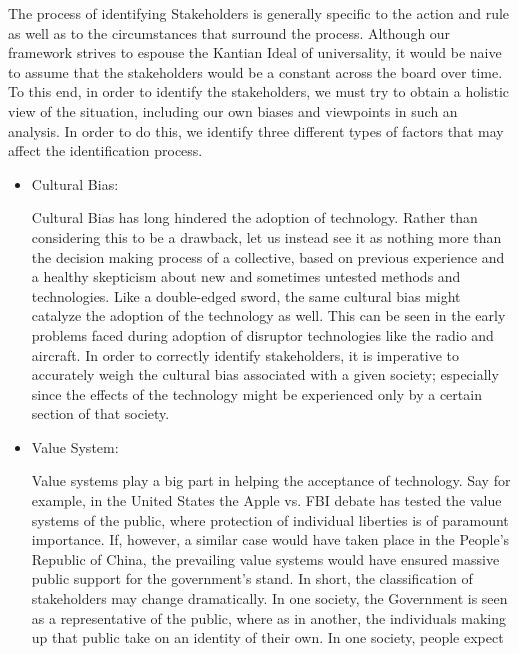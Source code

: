 The process of identifying Stakeholders is generally specific to the 
action and rule as well as to the circumstances that surround the 
process. Although our framework strives to espouse the Kantian Ideal 
of universality, it would be naive to assume that the stakeholders 
would be a constant across the board over time.  To this end, in order to 
identify the stakeholders, we must try to obtain a 
holistic view of the situation, including our own biases and viewpoints 
in such an analysis. In order to do this, we identify three 
different types of factors that may affect the identification process.
\begin{itemize}
  \item Cultural Bias:	  
    \begin{pointenv} %
      Cultural Bias has long hindered the adoption of technology. Rather than 
      considering this to be a drawback, let us instead see it as nothing more 
      than the decision making process of a collective, based on previous 
      experience and a healthy skepticism about new and sometimes untested 
      methods and technologies. Like a double-edged sword, the same cultural 
      bias might catalyze the adoption of the technology as well. This can be 
      seen in the early problems faced during adoption of disruptor 
      technologies like the radio and aircraft. In order to correctly identify 
      stakeholders, it is imperative to accurately weigh the cultural bias 
      associated with a given society; especially since the effects of the 
      technology might be experienced only by a certain section of that society.
    \end{pointenv}
  \item  Value System:
    \begin{pointenv}
      Value systems play a big part in helping the acceptance of technology. 
      Say for example, in the United States the Apple vs. FBI debate has 
      tested the value systems of the public, where protection of individual 
      liberties is of paramount importance. If, however, a similar case would 
      have taken place in the People's Republic of China, the prevailing value 
      systems would have ensured massive public support for the government's 
      stand. In short, the classification of stakeholders may change 
      dramatically.  In one society, the Government is seen as a representative 
      of the public, where as in another, the individuals making up that public 
      take on an identity of their own.  In one society, people expect 

\end{pointenv}
\end{itemize}
